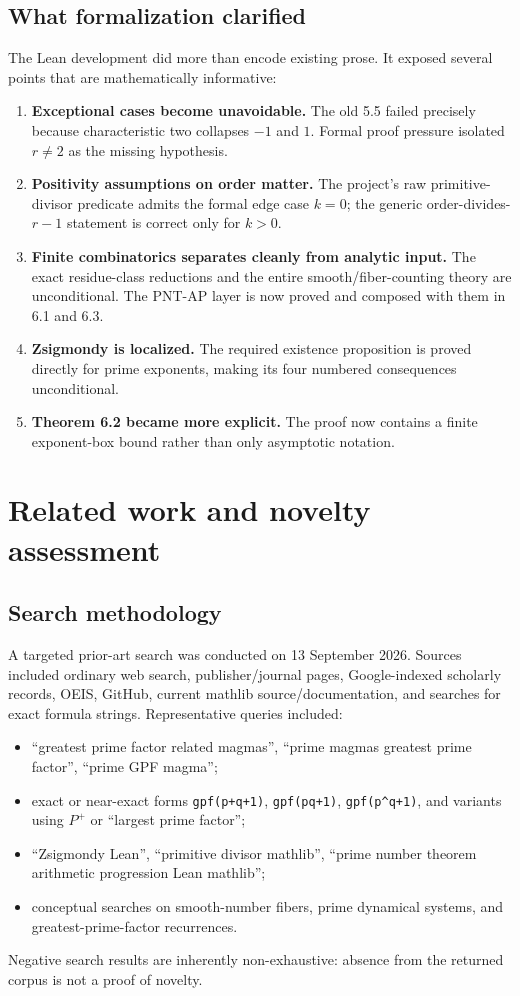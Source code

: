 \documentclass[11pt,a4paper,oneside,open=any,headings=small]{scrbook}
\theoremstyle{definition}
\newcommand{\lean}[1]{\ifmmode\text{\texttt{\detokenize{#1}}}\else\nolinkurl{#1}\fi}
\begin{document}
\section{What formalization clarified}
The Lean development did more than encode existing prose. It exposed several points that are mathematically informative:
\begin{enumerate}
\item \textbf{Exceptional cases become unavoidable.} The old 5.5 failed precisely because characteristic two collapses $-1$ and $1$. Formal proof pressure isolated $r\ne2$ as the missing hypothesis.
\item \textbf{Positivity assumptions on order matter.} The project's raw primitive-divisor predicate admits the formal edge case $k=0$; the generic order-divides-$r-1$ statement is correct only for $k>0$.
\item \textbf{Finite combinatorics separates cleanly from analytic input.} The exact residue-class reductions and the entire smooth/fiber-counting theory are unconditional. The PNT-AP layer is now proved and composed with them in 6.1 and 6.3.
\item \textbf{Zsigmondy is localized.} The required existence proposition is proved directly for prime exponents, making its four numbered consequences unconditional.
\item \textbf{Theorem 6.2 became more explicit.} The proof now contains a finite exponent-box bound rather than only asymptotic notation.
\end{enumerate}

\chapter{Related work and novelty assessment}\label{ch:novelty}

\section{Search methodology}
A targeted prior-art search was conducted on 13 September 2026. Sources included ordinary web search, publisher/journal pages, Google-indexed scholarly records, OEIS, GitHub, current mathlib source/documentation, and searches for exact formula strings. Representative queries included:
\begin{itemize}
\item ``greatest prime factor related magmas'', ``prime magmas greatest prime factor'', ``prime GPF magma'';
\item exact or near-exact forms \lean{gpf(p+q+1)}, \lean{gpf(pq+1)}, \lean{gpf(p^q+1)}, and variants using $P^+$ or ``largest prime factor'';
\item ``Zsigmondy Lean'', ``primitive divisor mathlib'', ``prime number theorem arithmetic progression Lean mathlib'';
\item conceptual searches on smooth-number fibers, prime dynamical systems, and greatest-prime-factor recurrences.
\end{itemize}
Negative search results are inherently non-exhaustive: absence from the returned corpus is not a proof of novelty.
\end{document}

